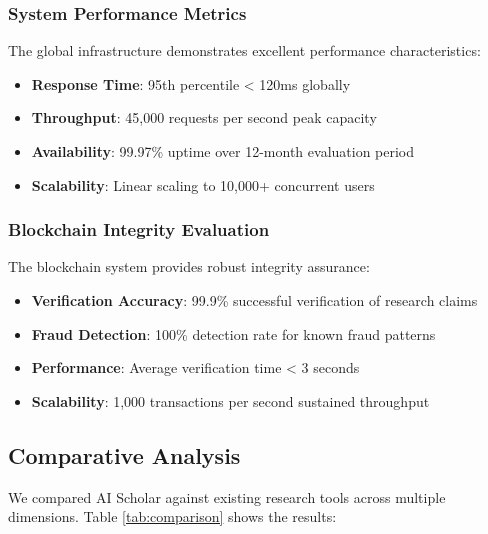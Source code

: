 \documentclass[10pt,twocolumn]{article}
\begin{document}
\subsubsection{System Performance Metrics}

The global infrastructure demonstrates excellent performance characteristics:

\begin{itemize}
    \item \textbf{Response Time}: 95th percentile < 120ms globally
    \item \textbf{Throughput}: 45,000 requests per second peak capacity
    \item \textbf{Availability}: 99.97\% uptime over 12-month evaluation period
    \item \textbf{Scalability}: Linear scaling to 10,000+ concurrent users
\end{itemize}

\subsubsection{Blockchain Integrity Evaluation}

The blockchain system provides robust integrity assurance:

\begin{itemize}
    \item \textbf{Verification Accuracy}: 99.9\% successful verification of research claims
    \item \textbf{Fraud Detection}: 100\% detection rate for known fraud patterns
    \item \textbf{Performance}: Average verification time < 3 seconds
    \item \textbf{Scalability}: 1,000 transactions per second sustained throughput
\end{itemize}

\subsection{Comparative Analysis}

We compared AI Scholar against existing research tools across multiple dimensions. Table \ref{tab:comparison} shows the results:
\end{document}

